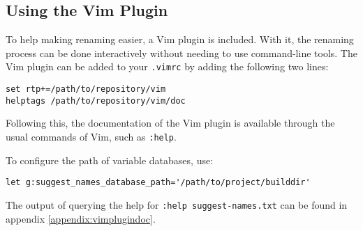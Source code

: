 \subsection{Using the Vim Plugin}
To help making renaming easier, a Vim \cite{vim} plugin is included.
With it, the renaming process can be done interactively without needing to use
command-line tools.
The Vim plugin can be added to your \lstinline|.vimrc| by adding the following
two lines:

\begin{lstlisting}
set rtp+=/path/to/repository/vim
helptags /path/to/repository/vim/doc
\end{lstlisting}

Following this, the documentation of the Vim plugin is available through the
usual commands of Vim, such as \lstinline|:help|.

To configure the path of variable databases, use:

\begin{lstlisting}
let g:suggest_names_database_path='/path/to/project/builddir'
\end{lstlisting}

The output of querying the help for \lstinline|:help suggest-names.txt| can be
found in appendix \ref{appendix:vimplugindoc}.
